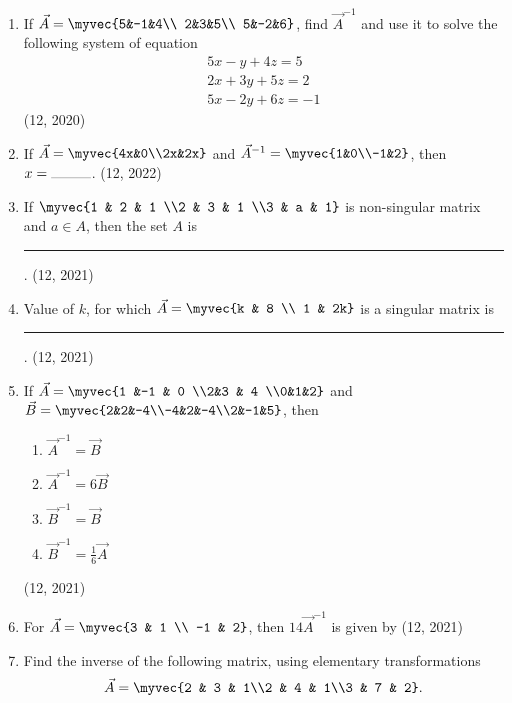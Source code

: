 \begin{enumerate}[label=\thesubsection.\arabic*,ref=\thesubsection.\theenumi]
\item If $\vec{A}= \myvec{5&-1&4\\ 2&3&5\\ 5&-2&6}$, find $\vec{A}^{-1}$ and use it to solve the following system of equation 
		\begin{align*}
			5x-y+4z=5\\
			2x+3y+5z=2\\
			5x-2y+6z=-1
		\end{align*}
\hfill (12, 2020)
\item If $\vec{A}= \myvec{4x&0\\2x&2x}$ and $\vec{A}^{-1}=\myvec{1&0\\-1&2}$, then $x= \rule{1cm}{0.2pt}$.
\hfill (12, 2022)
\item If $\myvec{1 & 2 & 1 \\2 & 3 & 1 \\3 & a & 1}$
is non-singular matrix and  $a \in A $, then the set $A$ is \rule{1cm}{0.2pt}. 
\hfill (12, 2021)
   \item Value of $k$, for which $\vec{A} =\myvec{k & 8 \\ 1 & 2k}$ is a singular matrix is \rule{1cm}{0.2pt}. 
\hfill (12, 2021)
    \item If $\vec{A} =\myvec{1 &-1 & 0 \\2&3 & 4 \\0&1&2}$ and $\vec{B} = \myvec{2&2&-4\\-4&2&-4\\2&-1&5}$, then
    \begin{enumerate}
        \item $\vec{A}^{-1} = \vec{B}$
        \item $\vec{A}^{-1} = 6\vec{B}$
        \item $\vec{B}^{-1} = \vec{B}$
        \item $\vec{B}^{-1} = \frac{1}{6} \vec{A}$
    \end{enumerate}
\hfill (12, 2021)
    \item For $\vec{A} =
        \myvec{3 & 1 \\ -1 & 2}$, then $14\vec{A}^{-1}$ is given by
\hfill (12, 2021)
\item Find the inverse of the following matrix, using elementary
transformations 
\begin{align*}
    \vec{A}=\myvec{2 & 3 & 1\\2 & 4 & 1\\3 & 7 & 2}.

\end{align*}
\end{enumerate}

